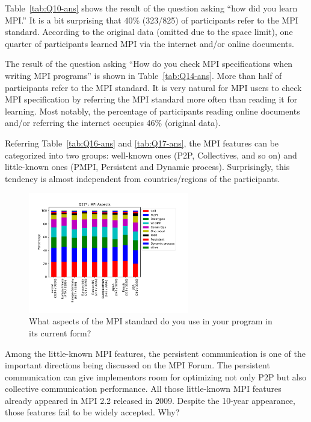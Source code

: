 \documentclass[sigconf,nonacm]{acmart}
\begin{document}
Table~\ref{tab:Q10-ans} shows the result of the question asking ``how
did you learn MPI.'' It is a bit surprising that 40\% (323/825) of
participants refer to the MPI standard. According to the original
data (omitted due to the space limit), one quarter of participants
learned MPI via the internet and/or online documents.

The result of the question asking ``How do you check MPI
specifications when writing MPI programs'' is shown in
Table~\ref{tab:Q14-ans}. More than half of participants refer to the
MPI standard. It is very natural for MPI users to check MPI
specification by referring the MPI standard more often than reading it
for learning. Most notably, the percentage of participants reading
online documents and/or referring the internet occupies 46\% (original
data).

Referring Table~\ref{tab:Q16-ans} and \ref{tab:Q17-ans}, the MPI
features can be categorized into two groups: well-known ones (P2P,
Collectives, and so on) and little-known ones (PMPI, Persistent and
Dynamic process). Surprisingly, this tendency is almost independent
from countries/regions of the participants.

\begin{figure}[htb]
\begin{center}
\includegraphics[width=7cm]{figs/Q17.pdf}
\caption{What aspects of the MPI standard do you use in your program in its current form?}%
\label{fig:Q17}
\end{center}
\end{figure}

Among the little-known MPI features, the persistent communication is
one of the important directions being discussed on the MPI Forum\cite{mpi-forum}.
The persistent communication can give implementors room for
optimizing not only P2P but also collective communication
performance.
All those little-known MPI features already appeared in MPI 2.2
released in 2009. Despite the 10-year appearance, those features
fail to be widely accepted.  Why?
\end{document}
